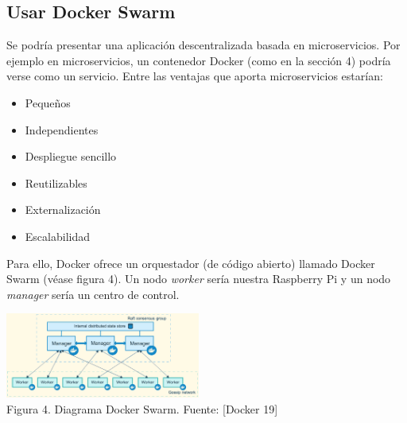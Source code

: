 \documentclass[12pt]{amsart}
\begin{document}
\begin{multicols}{2}
\subsection{Usar Docker Swarm} \label{ch:dockerswarm}
Se podría presentar una aplicación descentralizada basada en microservicios. Por ejemplo en microservicios, un contenedor Docker (como en la sección 4) podría verse como un servicio. Entre las ventajas que aporta microservicios estarían:
\begin{itemize}
 \item Pequeños
 \item Independientes
 \item Despliegue sencillo
 \item Reutilizables
 \item Externalización
 \item Escalabilidad
 \newline
\end{itemize}
Para ello, Docker ofrece un orquestador (de código abierto) llamado Docker Swarm (véase figura 4). Un nodo \textit{worker} sería nuestra Raspberry Pi y un nodo \textit{manager} sería un centro de control.
\begin{center}
  \includegraphics[keepaspectratio, width=0.481125\textwidth]{images/swarm-diagram-sourcedocker.eps}
\\
Figura 4. Diagrama Docker Swarm. Fuente: [Docker 19]
\\
\end{center}


\end{multicols}
\end{document}
